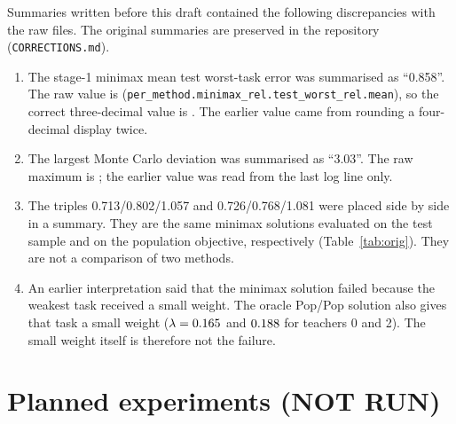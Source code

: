 Summaries written before this draft contained the following discrepancies with the raw files. The
original summaries are preserved in the repository (\texttt{CORRECTIONS.md}).
\begin{enumerate}
\item The stage-1 minimax mean test worst-task error was summarised as ``0.858''. The raw value is
\SOneMinimaxRawMean{} (\texttt{per\_method.minimax\_rel.test\_worst\_rel.mean}), so the correct three-decimal
value is \SOneMinimaxTestWorstMean. The earlier value came from rounding a four-decimal display
twice.
\item The largest Monte Carlo deviation was summarised as ``3.03''. The raw maximum is
\STwoMCWorstZ; the earlier value was read from the last log line only.
\item The triples 0.713/0.802/1.057 and 0.726/0.768/1.081 were placed side by side in a summary.
They are the same minimax solutions evaluated on the test sample and on the population objective,
respectively (Table~\ref{tab:orig}). They are not a comparison of two methods.
\item An earlier interpretation said that the minimax solution failed because the weakest task
received a small weight. The oracle Pop/Pop solution also gives that task a small weight
($\lambda=0.165$ and $0.188$ for teachers 0 and 2). The small weight
itself is therefore not the failure.
\end{enumerate}

\section{Planned experiments (NOT RUN)}
\label{app:planned}

